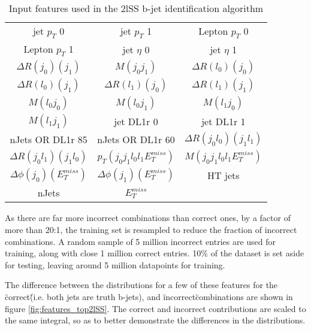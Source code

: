\begin{table}[h!]
  \begin{center}
  \begin{tabular}{ccc}
    jet  $p_T$ 0 & jet  $p_T$ 1 & Lepton  $p_T$ 0 \\
    Lepton  $p_T$ 1 & jet  $\eta$ 0 & jet  $\eta$ 1 \\
    $\Delta R(j_0)(j_1)$ & $M(j_0j_1)$ & $\Delta R(l_0)(j_0)$ \\
    $\Delta R(l_0)(j_1)$ & $\Delta R(l_1)(j_0)$ & $\Delta R(l_1)(j_1)$ \\
    $M(l_0j_0)$ & $M(l_0j_1)$ & $M(l_1j_0)$ \\
    $M(l_1j_1)$ & jet DL1r 0 & jet DL1r 1 \\
    nJets OR DL1r 85 & nJets OR DL1r 60 & $\Delta R(j_0l_0)(j_1l_1)$ \\
    $\Delta R(j_0l_1)(j_1l_0)$ &  $p_T(j_0j_1l_0l_1E_T^{miss})$ & $M(j_0j_1l_0l_1E_T^{miss})$ \\
    $\Delta\phi(j_0)(E_T^{miss})$ & $\Delta\phi(j_1)(E_T^{miss})$ & HT jets \\
    nJets & $E_T^{miss}$ & \\
  \end{tabular}
  \end{center}
  \caption{Input features used in the 2lSS b-jet identification algorithm}
  \label{tab:top2lSSfeatures}                                                                                               
\end{table}

As there are far more incorrect combinations than correct ones, by a factor of more than 20:1, the training set is resampled to reduce the fraction of incorrect combinations. A random sample of 5 million incorrect entries are used for training, along with close 1 million correct entries. 10\% of the dataset is set aside for testing, leaving around 5 million datapoints for training. 

The difference between the distributions for a few of these features for the \"correct\" (i.e. both jets are truth b-jets), and \"incorrect\" combinations are shown in figure \ref{fig:features_top2lSS}. The correct and incorrect contributions are scaled to the same integral, so as to better demonstrate the differences in the distributions.

